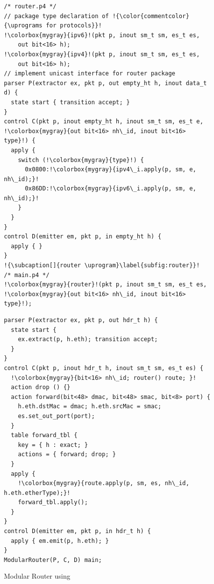 \documentclass[letterpaper,twocolumn,10pt]{article}
\begin{document}
\begin{figure}[!ht]
\noindent \begin{minipage}[t]{.50\textwidth}
\begin{lstlisting}[frame=none, escapechar=!]
/* router.p4 */
// package type declaration of !{\color{commentcolor}{\uprograms for protocols}}! 
!\colorbox{mygray}{ipv6}!(pkt p, inout sm_t sm, es_t es, 
    out bit<16> h);
!\colorbox{mygray}{ipv4}!(pkt p, inout sm_t sm, es_t es, 
    out bit<16> h);
// implement unicast interface for router package
parser P(extractor ex, pkt p, out empty_ht h, inout data_t d) {
  state start { transition accept; }
}
control C(pkt p, inout empty_ht h, inout sm_t sm, es_t e, 
!\colorbox{mygray}{out bit<16> nh\_id, inout bit<16> type}!) {
  apply {
    switch (!\colorbox{mygray}{type}!) {
      0x0800:!\colorbox{mygray}{ipv4\_i.apply(p, sm, e, nh\_id);}!
      0x86DD:!\colorbox{mygray}{ipv6\_i.apply(p, sm, e, nh\_id);}!
    }
  }
}
control D(emitter em, pkt p, in empty_ht h) {
  apply { }
}
!{\subcaption[]{router \uprogram}\label{subfig:router}}!
/* main.p4 */
!\colorbox{mygray}{router}!(pkt p, inout sm_t sm, es_t es, 
!\colorbox{mygray}{out bit<16> nh\_id, inout bit<16> type}!);
\end{lstlisting}
\end{minipage}\hspace{-4pt}\vline
\hfill\begin{minipage}[t]{.50\textwidth}
\begin{lstlisting}[frame=none, escapechar=!]
parser P(extractor ex, pkt p, out hdr_t h) {
  state start {
    ex.extract(p, h.eth); transition accept;
  }
}
control C(pkt p, inout hdr_t h, inout sm_t sm, es_t es) {
  !\colorbox{mygray}{bit<16> nh\_id; router() route; }!
  action drop () {}           
  action forward(bit<48> dmac, bit<48> smac, bit<8> port) {
    h.eth.dstMac = dmac; h.eth.srcMac = smac;
    es.set_out_port(port);
  }
  table forward_tbl {
    key = { h : exact; } 
    actions = { forward; drop; }
  }
  apply {
    !\colorbox{mygray}{route.apply(p, sm, es, nh\_id, 
h.eth.etherType);}!
    forward_tbl.apply(); 
  }
}
control D(emitter em, pkt p, in hdr_t h) {
  apply { em.emit(p, h.eth); }
}
ModularRouter(P, C, D) main;
\end{lstlisting}
\label{subfig:router-main}
\end{minipage}
\caption[]{Modular Router using \uarch \footnotemark}
\label{fig:modular-router}
\end{figure}
\end{document}
